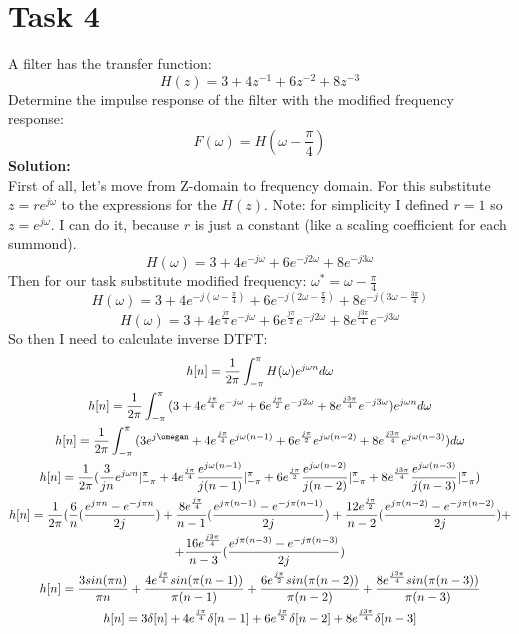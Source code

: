\documentclass[16pt]{report}
\begin{document}
\section*{Task 4}
A filter has the transfer function: 
$$ H(z) = 3+4z^{-1}+6z^{-2}+8z^{-3}$$
Determine the impulse response of the filter with the modified frequency response: 
$$ F(\omega) = H(\omega - \frac{\pi}{4}) $$
\textbf{Solution:} \\
First of all, let's move from Z-domain to frequency domain. For this substitute $z = re^{j\omega}$ to the expressions for the $H(z)$. Note: for simplicity I defined $r = 1$ so $z = e^{j\omega}$. I can do it, because $r$ is just a constant (like a scaling coefficient for each summond). \\
$$H(\omega) = 3 + 4e^{-j\omega} + 6e^{-j2\omega} + 8e^{-j3\omega}$$
Then for our task substitute modified frequency: $\omega^{*} = \omega -\frac{\pi}{4}$
$$H(\omega) = 3 + 4e^{-j(\omega - \frac{\pi}{4})} + 6e^{-j(2\omega -\frac{\pi}{2})} + 8e^{-j(3\omega-\frac{3\pi}{4})} $$
$$H(\omega) = 3 + 4e^{\frac{j\pi}{4}}e^{-j\omega}+6e^{\frac{j\pi}{2}}e^{-j2\omega}+8e^{\frac{j3\pi}{4}}e^{-j3\omega}$$
So then I need to calculate inverse DTFT:
\begin{gather*}
    h[n] = \frac{1}{2\pi}\int_{-\pi}^{\pi}{H(\omega)e^{j\omega n}d\omega}\\
    h[n] = \frac{1}{2\pi}\int_{-\pi}^{\pi}{(3+4e^{\frac{j\pi}{4}}e^{-j\omega} + 6e^{\frac{j\pi}{2}}e^{-j2\omega} +8e^{\frac{j3\pi}{4}}e^{-j3\omega})e^{j\omega n}d\omega}\\
    h[n] = \frac{1}{2\pi}\int_{-\pi}^{\pi}{(3e^{j\omegan}+4e^{\frac{j\pi}{4}}e^{j\omega(n-1)}+6e^{\frac{j\pi}{2}}e^{j\omega(n-2)}+8e^{\frac{j3\pi}{4}}e^{j\omega (n-3)})} d \omega\\
    h[n] = \frac{1}{2\pi}(\frac{3}{jn}e^{j\omega n }|_{-\pi}^{\pi}+4e^{\frac{j\pi}{4}}\frac{e^{j\omega (n-1)}}{j(n-1)}|_{-\pi}^{\pi} + 6e^{\frac{j\pi}{2}}\frac{e^{j\omega(n-2)}}{j(n-2)}|_{-\pi}^{\pi} + 8e^{\frac{j3\pi}{4}}\frac{e^{j\omega(n-3)}}{j(n-3)}|_{-\pi}^{\pi})\\
    h[n] = \frac{1}{2\pi}(\frac{6}{n}(\frac{e^{j\pi n} - e^{-j\pi n}}{2 j}) + \frac{8e^{\frac{j\pi}{4}}}{n-1}(\frac{e^{j\pi(n-1)}-e^{-j\pi(n-1)}}{2j})+ \frac{12e^{\frac{j\pi}{2}}}{n-2}(\frac{e^{j\pi(n-2)}-e^{-j\pi(n-2)}}{2j})+\\
    +\frac{16e^{\frac{j3\pi}{4}}}{n-3}(\frac{e^{j\pi(n-3)}-e^{-j\pi(n-3)}}{2j})\\
    h[n]=\frac{3sin(\pi n)}{\pi n} + \frac{4e^{\frac{j\pi}{4}}sin(\pi(n-1))}{\pi(n-1)} + \frac{6e^{\frac{j\pi}{2}}sin(\pi(n-2))}{\pi(n-2)} + 
    \frac{8e^{\frac{j3\pi}{4}}sin(\pi(n-3))}{\pi(n-3)}\\
    h[n] = 3\delta[n] + 4e^{\frac{j\pi}{4}}\delta[n-1]+6e^{\frac{j\pi}{2}}\delta[n-2]+ 8e^{\frac{j 3 \pi}{4}}\delta[n-3]\\
\end{gather*}
\end{document}
